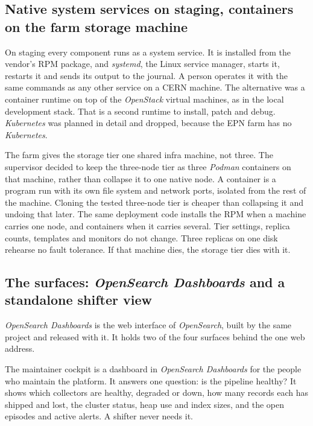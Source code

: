 \subsection{Native system services on staging, containers on the farm storage machine}\label{sec:why-systemd}

On staging every component runs as a system service. It is installed from the vendor's RPM package, and \textit{systemd}, the Linux service manager, starts it, restarts it and sends its output to the journal. A person operates it with the same commands as any other service on a CERN machine. The alternative was a container runtime on top of the \textit{OpenStack} virtual machines, as in the local development stack. That is a second runtime to install, patch and debug. \textit{Kubernetes} was planned in detail and dropped, because the EPN farm has no \textit{Kubernetes}.

The farm gives the storage tier one shared infra machine, not three. The supervisor decided to keep the three-node tier as three \textit{Podman} containers on that machine, rather than collapse it to one native node. A container is a program run with its own file system and network ports, isolated from the rest of the machine. Cloning the tested three-node tier is cheaper than collapsing it and undoing that later. The same deployment code installs the RPM when a machine carries one node, and containers when it carries several. Tier settings, replica counts, templates and monitors do not change. Three replicas on one disk rehearse no fault tolerance. If that machine dies, the storage tier dies with it.

\subsection{The surfaces: \textit{OpenSearch Dashboards} and a standalone shifter view}\label{sec:why-surfaces}

\textit{OpenSearch Dashboards} is the web interface of \textit{OpenSearch}, built by the same project and released with it. It holds two of the four surfaces behind the one web address.

The maintainer cockpit is a dashboard in \textit{OpenSearch Dashboards} for the people who maintain the platform. It answers one question: is the pipeline healthy? It shows which collectors are healthy, degraded or down, how many records each has shipped and lost, the cluster status, heap use and index sizes, and the open episodes and active alerts. A shifter never needs it.

